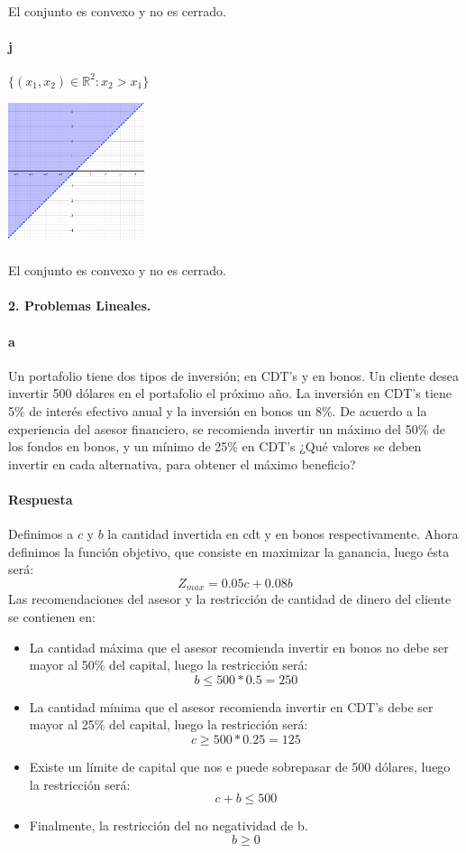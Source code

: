 \documentclass{article}
\begin{document}
	\paragraph{}El conjunto es convexo y no es cerrado.
	\paragraph{j} $\{ (x_1,x_2) \in \mathbb{R}^2: x_2 > x_1 \}$
	\begin{center}
		\includegraphics[width=0.3\textwidth]{j}
	\end{center}
	\paragraph{}El conjunto es convexo y no es cerrado.
	\paragraph{2. Problemas Lineales.}
	\paragraph{a} Un portafolio tiene dos tipos de inversión; en CDT's y en bonos. Un cliente desea invertir 500 dólares en el portafolio el próximo año. La inversión en CDT's tiene 5\% de interés efectivo anual y la inversión en bonos un 8\%. De acuerdo a la experiencia del asesor financiero, se recomienda invertir un máximo del 50\% de los fondos en bonos, y un mínimo de 25\% en CDT's ¿Qué valores se deben invertir en cada alternativa, para obtener el máximo beneficio?
	\paragraph{Respuesta} Definimos a $c$ y $b$ la cantidad invertida en cdt y en bonos respectivamente. Ahora definimos la función objetivo, que consiste en maximizar la ganancia, luego ésta será:
	$$Z_{max} = 0.05c + 0.08b$$
	Las recomendaciones del asesor y la restricción de cantidad de dinero del cliente se contienen en:
	\begin{itemize}
		\item La cantidad máxima que el asesor recomienda invertir en bonos no debe ser mayor al 50\% del capital, luego la restricción será:
		$$b \leq 500*0.5 = 250$$
		\item La cantidad mínima que el asesor recomienda invertir en CDT's debe ser mayor al 25\% del capital, luego la restricción será:
		$$c \geq 500*0.25 = 125 $$
		\item Existe un límite de capital que nos e puede sobrepasar de 500 dólares, luego la restricción será:
		$$c + b \leq 500$$
		\item Finalmente, la restricción del no negatividad de b.
		$$b \geq 0$$
	\end{itemize}
\end{document}
